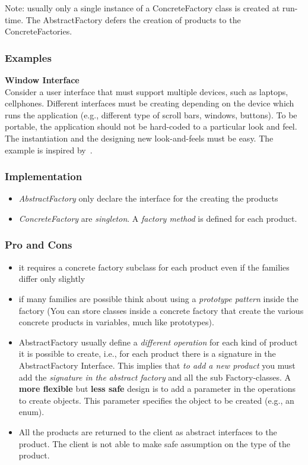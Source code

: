 \documentclass{article}
\begin{document}
Note: usually only a single instance of a ConcreteFactory class is created at run-time. The AbstractFactory defers the creation of products to the ConcreteFactories.

\subsubsection{Examples}
\textbf{Window Interface}\\
Consider a user interface that must support multiple devices, such as laptops, cellphones. Different interfaces must be creating depending on the device which runs the application (e.g., different type of scroll bars, windows, buttons). To be portable, the application should not be hard-coded to a particular look and feel. The instantiation and the designing new look-and-feels must be easy. The example is inspired by~\cite{gamma1994design}.


\subsubsection{Implementation}
\begin{itemize}
\item \emph{AbstractFactory} only declare the interface for the creating the products
\item \emph{ConcreteFactory} are \emph{singleton}. A \emph{factory method} is defined for each product. 

\end{itemize}

\subsubsection{Pro and Cons}
\begin{itemize}
\item it requires a concrete factory subclass for each product even if the families differ only slightly
\item if many families are possible think about using a \emph{prototype pattern} inside the factory (You can store classes inside a concrete factory that create the various concrete products in variables, much like prototypes).
\item AbstractFactory usually define a \emph{different operation} for each kind of product it is possible to create, i.e., for each product there is a signature in the AbstractFactory Interface. This implies that \emph{to add a new product} you must add the \emph{signature in the abstract factory} and all the sub Factory-classes. A \textbf{more flexible} but \textbf{less safe} design is to add a parameter in the operations to create objects. This parameter specifies the object to be created (e.g., an enum).
\item All the products are returned to the client as abstract interfaces to the product. The client is not able to make safe assumption on the type of the product.
\end{itemize}
\end{document}
